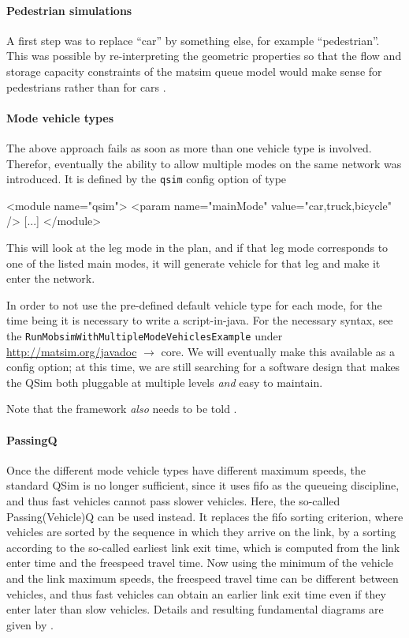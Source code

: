 \paragraph{Pedestrian simulations} A first step was to replace ``car'' by something else, for example ``pedestrian''.  This was possible by re-interpreting the geometric properties so that the flow and storage capacity constraints of the \gls{matsim} queue model  would make sense for pedestrians rather than for cars \cite{somePaperFromGregor} .  

\paragraph{Mode vehicle types} The above approach fails as soon as more than one vehicle type is involved.  Therefor, eventually the ability to allow multiple modes on the same network was introduced.  It is defined by the \lstinline{qsim} config option of type
\begin{xml}
<module name="qsim">
   <param name="mainMode" value="car,truck,bicycle" />
   [...]
</module>
\end{xml}
This will look at the leg mode in the plan, and if that leg mode corresponds to one of the listed main modes, it will generate vehicle for that leg and make it enter the network.


In order to not use the pre-defined default vehicle type for each mode, for the time being it is necessary to write a script-in-\gls{java}. For the necessary syntax, see the \lstinline{RunMobsimWithMultipleModeVehiclesExample} under \url{http://matsim.org/javadoc} $\to$ core.  We will eventually make this available as a config option; at this time, we are still searching for a software design that makes the QSim both pluggable at multiple levels \emph{and} easy to maintain.

Note that the framework \emph{also} needs to be told .

\paragraph{PassingQ} Once the different mode vehicle types have different maximum speeds, the standard QSim is no longer sufficient, since it uses \acrfull{fifo} as the queueing discipline, and thus fast vehicles cannot pass slower vehicles.  Here, the so-called Passing(Vehicle)Q can be used instead.  It replaces the \gls{fifo} sorting criterion, where vehicles are sorted by the sequence in which they arrive on the link, by a sorting according to the so-called earliest link exit time, which is computed from the link enter time and the freespeed travel time.  Now using the minimum of the vehicle and the link maximum speeds, the freespeed travel time can be different between vehicles, and thus fast vehicles can obtain an earlier link exit time even if they enter later than slow vehicles.  Details and resulting fundamental diagrams are given by \cite{AgarwalEtcMixedTraffic}.

